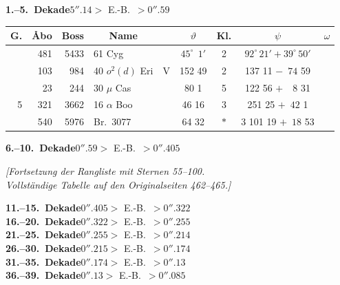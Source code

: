 \documentclass[12pt,a4paper]{article}
\theoremstyle{plain}
\theoremstyle{definition}
\theoremstyle{remark}
\begin{document}
\begin{small}
\begin{center}
\textbf{1.--5.~Dekade}\hspace{2cm}$5''\!\!.14 >$ E.-B.~$> 0''\!\!.59$
\end{center}
\begin{center}
\begin{tabular}{|r|r|r|l|c|c|c|c|c|}
\hline
G. & \AA bo & Boss & \multicolumn{1}{c|}{Name} & & $\vartheta$ & Kl. & $\psi$ & $\omega$ \\
\hline
  & 481 & 5433 & 61\phantom{0}\phantom{0} Cyg & & $45^{\circ}\;\,1'$ & 2 & $92^{\circ}\,21' +39^{\circ}\,50'$ & \\
  & 103 & 984 & 40 $o^{2}(d)$ Eri & V & 152 49 & 2 & 137 11 $-\phantom{0}74$ 59 & \\
  & 23 & 244 & 30 $\mu$\phantom{0}\phantom{0} Cas & & 80 \phantom{0}1 & 5 & 122 56 $+\phantom{0}\phantom{0}8$ 31 & \\
 5 & 321 & 3662 & 16 $\alpha$\phantom{0}\phantom{0} Boo & & 46 16 & 3 & 251 25 $+\phantom{0}42$ \phantom{0}1 & \\
  & 540 & 5976 & Br.~3077\phantom{0}\phantom{0} & & 64 32 & $*$ & 3 101 19 $+\phantom{0}18$ 53 & \\
\hline
\end{tabular}
\end{center}
\end{small}

\medskip
\begin{small}
\begin{center}
\textbf{6.--10.~Dekade}\hspace{2cm}$0''\!\!.59 >$ E.-B.~$> 0''\!\!.405$
\end{center}
\begin{center}
\textit{[Fortsetzung der Rangliste mit Sternen 55--100.\\
Vollst\"andige Tabelle auf den Originalseiten 462--465.]}
\end{center}
\end{small}

\medskip
\begin{small}
\begin{center}
\textbf{11.--15.~Dekade}\hspace{2cm}$0''\!\!.405 >$ E.-B.~$> 0''\!\!.322$\\[4pt]
\textbf{16.--20.~Dekade}\hspace{2cm}$0''\!\!.322 >$ E.-B.~$> 0''\!\!.255$\\[4pt]
\textbf{21.--25.~Dekade}\hspace{2cm}$0''\!\!.255 >$ E.-B.~$> 0''\!\!.214$\\[4pt]
\textbf{26.--30.~Dekade}\hspace{2cm}$0''\!\!.215 >$ E.-B.~$> 0''\!\!.174$\\[4pt]
\textbf{31.--35.~Dekade}\hspace{2cm}$0''\!\!.174 >$ E.-B.~$> 0''\!\!.13$\\[4pt]
\textbf{36.--39.~Dekade}\hspace{2cm}$0''\!\!.13 >$ E.-B.~$> 0''\!\!.085$
\end{center}
\end{small}
\end{document}
